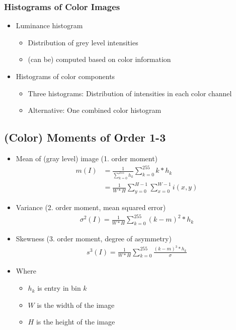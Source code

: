 \documentclass{scrartcl}
\begin{document}
\subsubsection{Histograms of Color Images}

\begin{itemize}
	\item Luminance histogram
	\begin{itemize}
		\item Distribution of grey level intensities
		\item (can be) computed based on color information
	\end{itemize}
	\item Histograms of color components
	\begin{itemize}
		\item Three histograms: Distribution of intensities in each color channel
		\item Alternative: One combined color histogram
	\end{itemize}
\end{itemize}

\subsection{(Color) Moments of Order 1-3}

\begin{itemize}
	\item Mean of (gray level) image (1. order moment)
	\begin{align*}
		m(I)&=\frac{1}{\sum_{k=0}^{255} h_k} \sum_{k=0}^{255} k * h_k \\
		&=\frac{1}{W*H} \sum_{y=0}^{H-1} \sum_{x=0}^{W-1} i(x,y)
	\end{align*}
	\item Variance (2. order moment, mean squared error)
	\begin{align*}
		\sigma^2(I)=\frac{1}{W*H} \sum_{k=0}^{255} (k-m)^2*h_k
	\end{align*}
	\item Skewness (3. order moment, degree of asymmetry)
	\begin{align*}
		s^3(I)=\frac{1}{W*H} \sum_{k=0}^{255} \frac{(k-m)^3*h_k}{\sigma}
	\end{align*}
	\item Where
	\begin{itemize}
		\item $ h_k $ is entry in bin $ k $
		\item $ W $ is the width of the image
		\item $ H $ is the height of the image
	\end{itemize}
\end{itemize}
\end{document}
